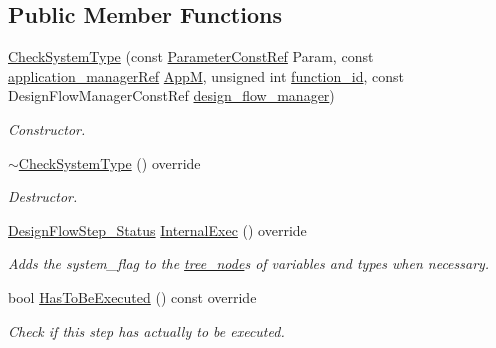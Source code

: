 \subsection*{Public Member Functions}
\begin{DoxyCompactItemize}
\item 
\hyperlink{classCheckSystemType_a906a6f4b26c4875ed202946089edc1f8}{Check\+System\+Type} (const \hyperlink{Parameter_8hpp_a37841774a6fcb479b597fdf8955eb4ea}{Parameter\+Const\+Ref} Param, const \hyperlink{application__manager_8hpp_a04ccad4e5ee401e8934306672082c180}{application\+\_\+manager\+Ref} \hyperlink{classFrontendFlowStep_a0ac0d8db2a378416583f51c4faa59d15}{AppM}, unsigned int \hyperlink{classFunctionFrontendFlowStep_a58ef2383ad1a212a8d3f396625a4b616}{function\+\_\+id}, const Design\+Flow\+Manager\+Const\+Ref \hyperlink{classDesignFlowStep_ab770677ddf087613add30024e16a5554}{design\+\_\+flow\+\_\+manager})
\begin{DoxyCompactList}\small\item\em Constructor. \end{DoxyCompactList}\item 
\hyperlink{classCheckSystemType_a48875d72d3a25555a93445724530e775}{$\sim$\+Check\+System\+Type} () override
\begin{DoxyCompactList}\small\item\em Destructor. \end{DoxyCompactList}\item 
\hyperlink{design__flow__step_8hpp_afb1f0d73069c26076b8d31dbc8ebecdf}{Design\+Flow\+Step\+\_\+\+Status} \hyperlink{classCheckSystemType_ae3324caec3c8b0a2bc347b773670458f}{Internal\+Exec} () override
\begin{DoxyCompactList}\small\item\em Adds the system\+\_\+flag to the \hyperlink{classtree__node}{tree\+\_\+node}\textquotesingle{}s of variables and types when necessary. \end{DoxyCompactList}\item 
bool \hyperlink{classCheckSystemType_a0e9660fbad92ffdc163cae8d108df86c}{Has\+To\+Be\+Executed} () const override
\begin{DoxyCompactList}\small\item\em Check if this step has actually to be executed. \end{DoxyCompactList}\end{DoxyCompactItemize}
